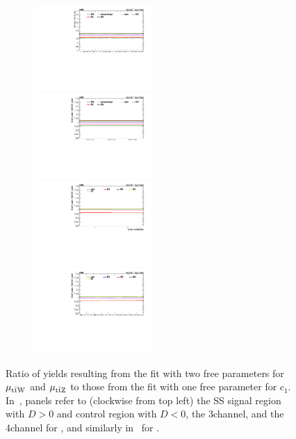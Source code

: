 \begin{figure}
\begin{subfigure}{\linewidth}
    \caption{}
    \label{sfig:ratio-cuG}
  \end{subfigure}
  \begin{subfigure}{\linewidth}
    \centering
    \includegraphics[width=0.5\textwidth]{figures/thirteen-TeV/postfit/ratio_2l_cuW}%
    \includegraphics[width=0.5\textwidth]{figures/thirteen-TeV/postfit/ratio_2l-cr_cuW}
    \includegraphics[width=0.5\textwidth]{figures/thirteen-TeV/postfit/ratio_4l_cuW}%
    \includegraphics[width=0.5\textwidth]{figures/thirteen-TeV/postfit/ratio_3l_cuW}
    \caption{}
    \label{sfig:ratio-cuW}
  \end{subfigure}
  \caption[Ratio of two and one-dimensional fit yields for \cuG and \cuW (\thirteenTeV)]{Ratio of yields resulting from the fit with two free parameters for $\mu_{\text{t}\bar{\text{t}}\text{W}}$ and $\mu_{\text{t}\bar{\text{t}}\text{Z}}$ to those from the fit with one free parameter for $c_1$. In~, panels refer to (clockwise from top left) the SS \ttW signal region with $D > 0$ and control region with $D < 0$, the 3\lep \ttZ channel, and the 4\lep \ttZ channel for \cuG, and similarly in~ for \cuW.}
    \label{fig:ratio-cuG-cuW}
\end{figure}
